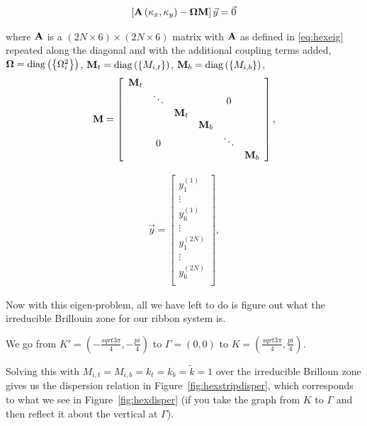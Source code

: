 \begin{align}
  \left[\mathbf{A}\left(\kappa_{x},\kappa_{y}\right)-\mathbf{\Omega}\mathbf{M}\right]\vec{y}=\vec{0}
\label{eq:hexstripeig}
\end{align}

where $\mathbf{A}$ is a $(2N \times 6) \times (2N \times 6)$ matrix with
$\mathbf{A}$ as defined in \eqref{eq:hexeig} repeated along the diagonal and with
the additional coupling terms added,
$\mathbf{\Omega}=\operatorname{diag}\left(\left\{\Omega_i^2\right\}\right)$,
$\mathbf{M}_{t}=\operatorname{diag}\left(\left\{M_{i,t}\right\}\right)$,
$\mathbf{M}_{b}=\operatorname{diag}\left(\left\{M_{i,b}\right\}\right)$,
\begin{align}
\mathbf{M}=\left[
\begin{array}{cccccc}
\mathbf{M}_{t}\\
 & \ddots &  &  & 0\\
 &  & \mathbf{M}_{t}\\
 &  &  & \mathbf{M}_{b}\\
 & 0 &  &  & \ddots\\
 &  &  &  &  & \mathbf{M}_{b}
\end{array}\right],
\end{align}

\begin{align}
\vec{y}=\left[
\begin{array}{c}
y_1^{(1)}\\
\vdots\\
y_6^{(1)}\\
\vdots\\
y_1^{(2N)}\\
\vdots\\
y_6^{(2N)}\\
\end{array}\right],
\end{align}

Now with this eigen-problem, all we have left to do is figure out what the
irreducible Brillouin zone for our ribbon system is.

We go from $K'=(-\frac{sqrt{3}\pi}{4},-\frac{pi}{4})$ to $\Gamma=(0,0)$ to
$K=(\frac{sqrt{3}\pi}{4},\frac{pi}{4})$.

Solving this with $M_{i,t}=M_{i,b}=k_t=k_b=\tilde{k}=1$ over the irreducible
Brilloun zone gives us the dispersion relation in
Figure~\ref{fig:hexstripdisper}, which corresponds to what we see in
Figure~\ref{fig:hexdisper} (if you take the graph from $K$ to $\Gamma$ and then
reflect it about the vertical at $\Gamma$).

